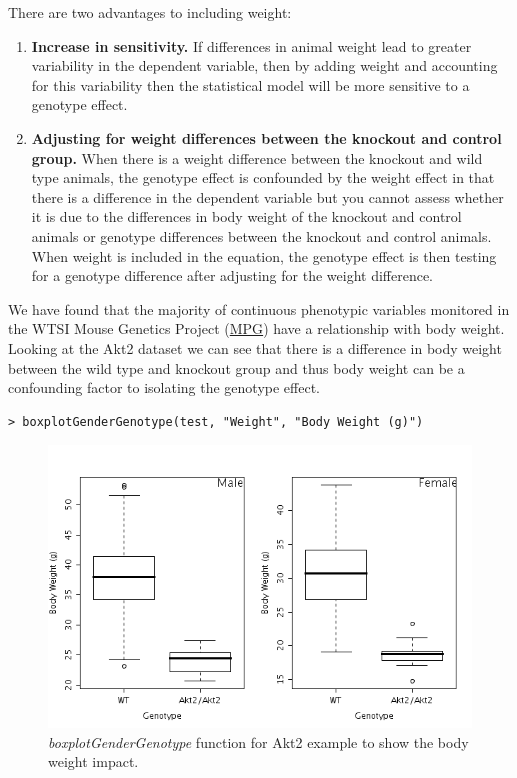 \documentclass[12pt,a4paper]{article}
\begin{document}
There are two advantages to including weight:
\begin{enumerate}
 \item \textbf{Increase in sensitivity.}  
If differences in animal weight lead to greater variability in the dependent variable, then by adding weight and accounting for this variability then the statistical model will be more sensitive to a genotype effect. 

 \item \textbf{Adjusting for weight differences between the knockout and control group.}  
When there is a weight difference between the knockout and wild type animals, the genotype effect is confounded by the weight effect in that there is a difference in the dependent variable but you cannot assess whether it is due to the differences in body weight of the knockout and control animals or genotype differences between the knockout and control animals. When weight is included in the equation, the genotype effect is then testing for a genotype difference after adjusting for the weight difference.

\end{enumerate}

We have found that the majority of continuous phenotypic variables monitored in the WTSI Mouse Genetics Project (\href{http://www.sanger.ac.uk/resources/mouse/}{MPG}) have a relationship with body weight. 
Looking at the Akt2 dataset we can see that there is a difference in body weight between the wild type and knockout group and thus body weight can be a confounding factor to isolating the genotype effect.   

\begingroup
    \fontsize{8pt}{12pt}\selectfont
\begin{verbatim}
> boxplotGenderGenotype(test, "Weight", "Body Weight (g)")
\end{verbatim}
\endgroup 

\begin{figure}[H]%
\centerline{\includegraphics[scale=0.5]{cs1_bodyweight.png}}
\caption{\textit{boxplotGenderGenotype} function for Akt2 example to show the body weight impact.}\label{fig:21}
\end{figure}
\end{document}
